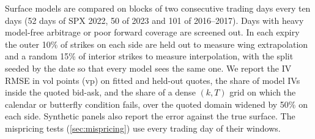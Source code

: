 Surface models are compared on blocks of two consecutive trading days every ten days (52 days of
SPX 2022, 50 of 2023 and 101 of 2016--2017). Days with heavy model-free arbitrage or poor forward
coverage are screened out. In each expiry the outer 10\% of strikes on each side are held out to
measure wing extrapolation and a random 15\% of interior strikes to measure interpolation, with the
split seeded by the date so that every model sees the same one. We report the IV RMSE in vol points
(vp) on fitted and held-out quotes, the share of model IVs inside the quoted bid-ask, and the share
of a dense $(k,T)$ grid on which the calendar or butterfly condition fails, over the quoted domain
widened by 50\% on each side. Synthetic panels also report the error against the true surface. The
mispricing tests (\cref{sec:mispricing}) use every trading day of their windows.
